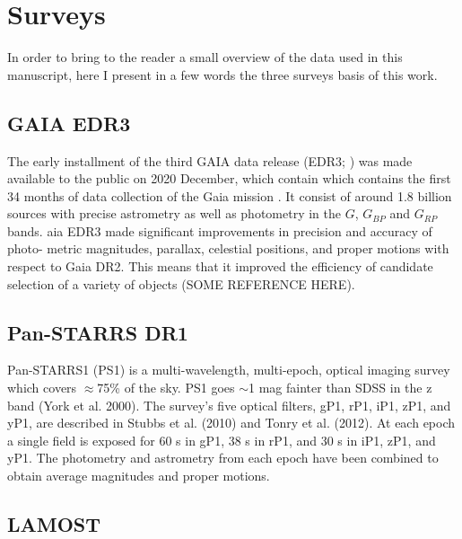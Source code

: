 \documentclass[fleqn,usenatbib]{mnras}
\begin{document}
\section{Surveys}
\label{sec:surveys}

In order to bring to the reader a small overview of the data used
in this manuscript, here I present in a few words the three
surveys basis of this work.

\subsection{GAIA EDR3}
\label{sec:gaia}

The early installment of the third
GAIA data release (EDR3; \citealp{Brown:2021}) was made available to the public
on 2020 December, which contain which contains the first 34 months
of data collection of the Gaia mission \citep{Brown:2018}.
It consist of around 1.8 billion sources
with precise astrometry as well as photometry in
the $G$, $G_{BP}$ and $G_{RP}$ bands. aia EDR3 made
significant improvements in precision and accuracy of photo-
metric magnitudes, parallax, celestial positions, and proper
motions with respect to Gaia DR2. This means that it improved
the efficiency of candidate selection of a variety of
objects (SOME REFERENCE HERE).

\subsection{Pan-STARRS DR1}
\label{sec:PS1}

Pan-STARRS1 (PS1)
is a multi-wavelength, multi-epoch, optical imaging survey
which covers $\approx$75\% of the sky. PS1 goes $\sim$1 mag fainter
than SDSS in the z band (York et al. 2000). The survey’s five optical
filters, gP1, rP1, iP1, zP1, and yP1, are described in Stubbs et al.
(2010) and Tonry et al. (2012). At each epoch a single field
is exposed for 60 s in gP1, 38 s in rP1, and 30 s in iP1, zP1,
and yP1. The photometry and astrometry from each epoch
have been combined to obtain average magnitudes and proper
motions.

\subsection{LAMOST}
\label{sec:lamost}
\end{document}
